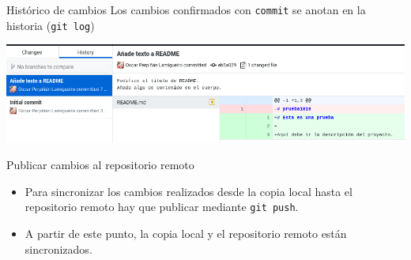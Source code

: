 \documentclass[xcolor={usenames,svgnames,dvipsnames}]{beamer}
\begin{document}
\begin{frame}[label={sec:orgf8532a6},fragile]{Histórico de cambios}
 Los cambios confirmados con \texttt{commit} se anotan en la historia (\texttt{git log})

\begin{center}
\end{center}

\begin{center}
\includegraphics[width=.9\linewidth]{figs/git_history.png}
\end{center}
\end{frame}


\begin{frame}[label={sec:orgf11fede},fragile]{Publicar cambios al repositorio remoto}
 \begin{itemize}
\item Para sincronizar  los cambios realizados \alert{desde la copia local hasta el repositorio remoto} hay que publicar mediante \texttt{git push}.
\end{itemize}

\begin{center}
\end{center}

\begin{itemize}
\item A partir de este punto, la copia local y el repositorio remoto están sincronizados.
\end{itemize}
\end{frame}
\end{document}
